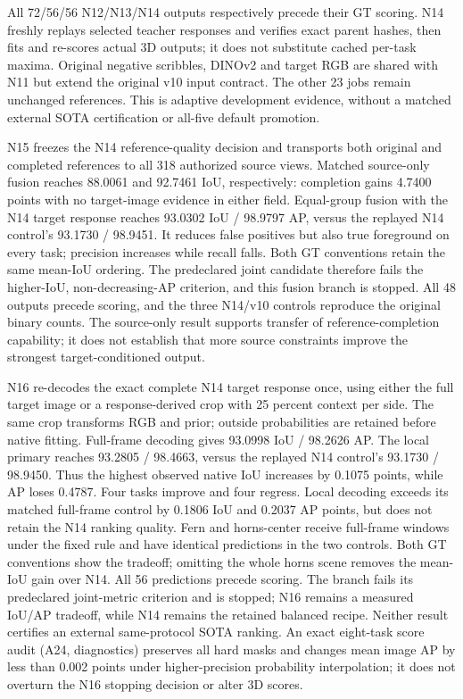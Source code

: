 All 72/56/56 N12/N13/N14 outputs respectively precede their GT scoring. N14
freshly replays selected teacher responses and verifies exact parent hashes,
then fits and re-scores actual 3D outputs; it does not substitute cached
per-task maxima. Original negative scribbles, DINOv2 and target RGB are shared
with N11 but extend the original v10 input contract. The other 23 jobs remain
unchanged references. This is adaptive development evidence, without a matched
external SOTA certification or all-five default promotion.

N15 freezes the N14 reference-quality decision and transports both original and
completed references to all 318 authorized source views. Matched source-only
fusion reaches 88.0061 and 92.7461 IoU, respectively: completion gains 4.7400
points with no target-image evidence in either field. Equal-group fusion with
the N14 target response reaches 93.0302 IoU / 98.9797 AP, versus the replayed
N14 control's 93.1730 / 98.9451. It reduces false positives but also true
foreground on every task; precision increases while recall falls. Both GT
conventions retain the same mean-IoU ordering. The predeclared joint candidate
therefore fails the higher-IoU, non-decreasing-AP criterion, and this fusion
branch is stopped. All 48 outputs precede scoring, and the three N14/v10
controls reproduce the original binary counts. The source-only result supports
transfer of reference-completion capability; it does not establish that more
source constraints improve the strongest target-conditioned output.

N16 re-decodes the exact complete N14 target response once, using either the
full target image or a response-derived crop with 25 percent context per side.
The same crop transforms RGB and prior; outside probabilities are retained
before native fitting. Full-frame decoding gives 93.0998 IoU / 98.2626 AP.
The local primary reaches 93.2805 / 98.4663, versus the replayed N14 control's
93.1730 / 98.9450. Thus the highest observed native IoU increases by 0.1075
points, while AP loses 0.4787. Four tasks improve and four regress. Local
decoding exceeds its matched full-frame control by 0.1806 IoU and 0.2037 AP
points, but does not retain the N14 ranking quality. Fern and horns-center
receive full-frame windows under the fixed rule and have identical predictions
in the two controls. Both GT conventions show the tradeoff; omitting the whole
horns scene removes the mean-IoU gain over N14. All 56 predictions precede
scoring. The branch fails its predeclared joint-metric criterion and is stopped;
N16 remains a measured IoU/AP tradeoff, while N14 remains the retained balanced
recipe. Neither result certifies an external same-protocol SOTA ranking.
An exact eight-task score audit (A24, diagnostics) preserves all hard masks and
changes mean image AP by less than 0.002 points under higher-precision probability
interpolation; it does not overturn the N16 stopping decision or alter 3D scores.

